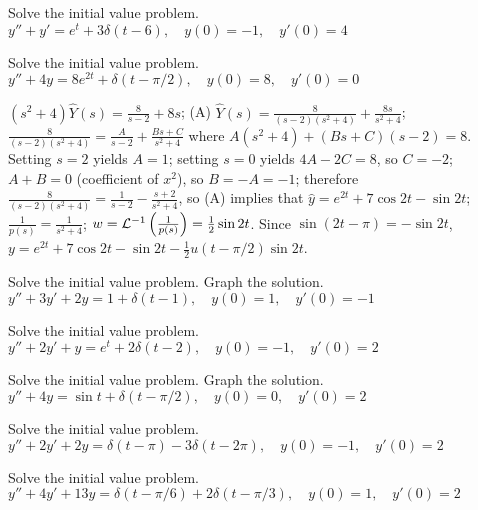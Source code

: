 \documentclass{ximera}
\begin{document}
\begin{problem}\label{exer:8.7.7}
Solve the initial value
problem.
 $y''+y'=e^t+3\delta(t-6), \quad  y(0)=-1,\quad y'(0)=4$
\end{problem}

\begin{problem}\label{exer:8.7.8}
Solve the initial value
problem.
 $y''+4y=8e^{2t}+\delta(t-\pi/2), \quad  y(0)=8,\quad y'(0)=0$

\begin{solution}
$(s^2+4)\hat Y(s)=\frac{8}{s-2}+8s$;
(A) $\hat Y(s)=\frac{8}{(s-2)(s^2+4)}+\frac{8s}{s^2+4}$;
$\frac{8}{(s-2)(s^2+4)}=\frac{A}{s-2}+\frac{Bs+C}{s^2+4}$
where $A(s^2+4)+(Bs+C)(s-2)=8$. Setting $s=2$ yields $A=1$;
setting $s=0$ yields $4A-2C=8$, so $C=-2$; $A+B=0$
(coefficient of $x^2$), so $B=-A=-1$; therefore
$\frac{8}{(s-2)(s^2+4)}=\frac{1}{s-2}-\frac{s+2}{s^2+4}$, so
(A) implies that
$\hat y=e^{2t}+7\cos2t-\sin2t$;
$\frac{1}{p(s)}=\frac{1}{s^2+4}$;
$w={\cal L}^{-1}\left(\frac{1}{p(s)}\right)=\frac{1}{2}\sin2t$.
Since $\sin(2t-\pi)=-\sin2t$,
$y=e^{2t}+7\cos2t-\sin2t-\frac{1}{2}u(t-\pi/2)\sin2t$.
\end{solution}
\end{problem}

\begin{problem}\label{exer:8.7.9} Solve the initial value problem.  Graph the solution.
 $y''+3y'+2y=1+\delta(t-1), \quad  y(0)=1,\quad y'(0)=-1$
\end{problem}

\begin{problem}\label{exer:8.7.10}
Solve the initial value
problem.
 $y''+2y'+y=e^t+2\delta(t-2), \quad  y(0)=-1,\quad y'(0)=2$
\end{problem}

\begin{problem}\label{exer:8.7.11} Solve the initial value problem.  Graph the solution.
 $y''+4y=\sin t+\delta(t-\pi/2), \quad  y(0)=0,\quad y'(0)=2$
\end{problem}

\begin{problem}\label{exer:8.7.12}
Solve the initial value
problem.
 $y''+2y'+2y=\delta(t-\pi)-3\delta(t-2\pi), \quad  y(0)=-1,\quad y'(0)=2$
\end{problem}

\begin{problem}\label{exer:8.7.13}
Solve the initial value
problem.
$y''+4y'+13y=\delta(t-\pi/6)+2\delta(t-\pi/3), \quad  y(0)=1,\quad y'(0)=2$
\end{problem}
\end{document}
